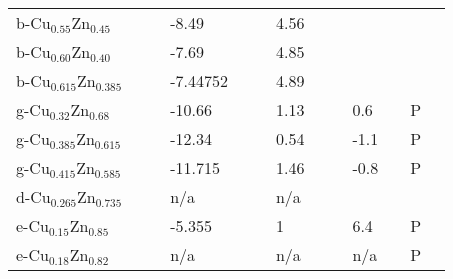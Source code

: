 \documentclass{article}
\begin{document}
\begin{center}
\begin{longtable}{|l|p{2.5cm}|l|p{2.5cm}|l|l|p{2.5cm}|l|l|p{2.5cm}|l|l|l|}
b-Cu$_{0.55}$Zn$_{0.45} $  &                            &     & -8.49               &     & \citep{KubaschewskiCatterallJohnAshley.1956}     & 4.56               &     & \citep{KubaschewskiCatterallJohnAshley.1956} &                                     &     &     &  \\
b-Cu$_{0.60}$Zn$_{0.40} $  &                            &     & -7.69               &     & \citep{KubaschewskiCatterallJohnAshley.1956}     & 4.85               &     & \citep{KubaschewskiCatterallJohnAshley.1956} &                                     &     &     &  \\
b-Cu$_{0.615}$Zn$_{0.385}$ &                            &     & -7.44752            &     & \citep{KubaschewskiCatterallJohnAshley.1956}     & 4.89               &     & \citep{KubaschewskiCatterallJohnAshley.1956} &                                     &     &     &  \\
g-Cu$_{0.32}$Zn$_{0.68} $  &                            &     & -10.66              &     & \citep{KubaschewskiCatterallJohnAshley.1956}     & 1.13               &     & \citep{KubaschewskiCatterallJohnAshley.1956} & 0.6                                 &     & P   &  \\
g-Cu$_{0.385}$Zn$_{0.615}$ &                            &     & -12.34              &     & \citep{KubaschewskiCatterallJohnAshley.1956}     & 0.54               &     & \citep{KubaschewskiCatterallJohnAshley.1956} & -1.1                               &     & P   &  \\
g-Cu$_{0.415}$Zn$_{0.585}$ &                            &     & -11.715             &     & \citep{KubaschewskiCatterallJohnAshley.1956}     & 1.46               &     & \citep{KubaschewskiCatterallJohnAshley.1956} & -0.8                              &     & P   &  \\
d-Cu$_{0.265}$Zn$_{0.735}$ &                            &     & n/a                 &     & \citep{KubaschewskiCatterallJohnAshley.1956}     & n/a                &     & \citep{KubaschewskiCatterallJohnAshley.1956} &                                     &     &     &  \\
e-Cu$_{0.15}$Zn$_{0.85} $  &                            &     & -5.355              &     & \citep{KubaschewskiCatterallJohnAshley.1956}     & 1                  &     & \citep{KubaschewskiCatterallJohnAshley.1956} & 6.4                                 &     & P   &  \\
e-Cu$_{0.18}$Zn$_{0.82} $  &                            &     & n/a                 &     & \citep{KubaschewskiCatterallJohnAshley.1956}     & n/a                &     & \citep{KubaschewskiCatterallJohnAshley.1956} & n/a                                 &     & P   &  \\

\end{longtable}
\end{center}
\end{document}
